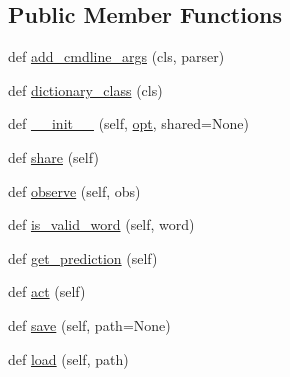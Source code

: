 \subsection*{Public Member Functions}
\begin{DoxyCompactItemize}
\item 
def \hyperlink{classparlai_1_1agents_1_1unigram_1_1unigram_1_1UnigramAgent_a975b292cb31540e198a220d3c9bd7ea5}{add\+\_\+cmdline\+\_\+args} (cls, parser)
\item 
def \hyperlink{classparlai_1_1agents_1_1unigram_1_1unigram_1_1UnigramAgent_a832c1e669ba04ca3c6258216cc82bdca}{dictionary\+\_\+class} (cls)
\item 
def \hyperlink{classparlai_1_1agents_1_1unigram_1_1unigram_1_1UnigramAgent_a8e406a0b849d5f823b66329c5285c29c}{\+\_\+\+\_\+init\+\_\+\+\_\+} (self, \hyperlink{classparlai_1_1agents_1_1unigram_1_1unigram_1_1UnigramAgent_abfbd6ca4f56545ac9c4514f38e65d1a2}{opt}, shared=None)
\item 
def \hyperlink{classparlai_1_1agents_1_1unigram_1_1unigram_1_1UnigramAgent_a92213f8bec03859a310d5535a077e999}{share} (self)
\item 
def \hyperlink{classparlai_1_1agents_1_1unigram_1_1unigram_1_1UnigramAgent_a2c0cb628c4cc600b0968e6161d7a139a}{observe} (self, obs)
\item 
def \hyperlink{classparlai_1_1agents_1_1unigram_1_1unigram_1_1UnigramAgent_ae00fc04461f0ff1442bd894a5b574a3e}{is\+\_\+valid\+\_\+word} (self, word)
\item 
def \hyperlink{classparlai_1_1agents_1_1unigram_1_1unigram_1_1UnigramAgent_a0688b7cf7ef26834f8ff11f0893fa45b}{get\+\_\+prediction} (self)
\item 
def \hyperlink{classparlai_1_1agents_1_1unigram_1_1unigram_1_1UnigramAgent_a525621d38b382d27fad882ca4a8c682a}{act} (self)
\item 
def \hyperlink{classparlai_1_1agents_1_1unigram_1_1unigram_1_1UnigramAgent_ae0178adc22b61bc37632eed426f853df}{save} (self, path=None)
\item 
def \hyperlink{classparlai_1_1agents_1_1unigram_1_1unigram_1_1UnigramAgent_a01fa26682df757201166d6f18be60da8}{load} (self, path)
\end{DoxyCompactItemize}
